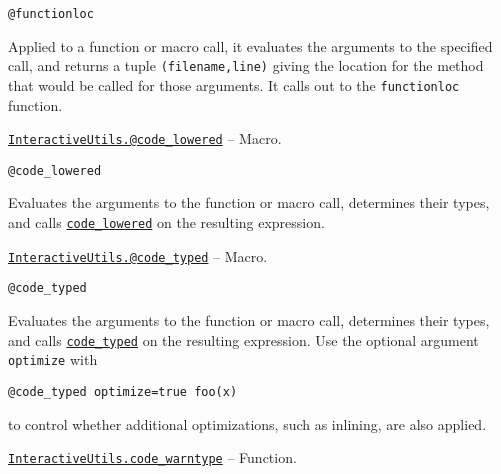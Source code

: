 \begin{adjustwidth}{2em}{0pt}


\begin{verbatim}
@functionloc
\end{verbatim}

Applied to a function or macro call, it evaluates the arguments to the specified call, and returns a tuple \texttt{(filename,line)} giving the location for the method that would be called for those arguments. It calls out to the \texttt{functionloc} function.



\end{adjustwidth}
\hypertarget{1376948972689074219}{} 
\hyperlink{1376948972689074219}{\texttt{InteractiveUtils.@code\_lowered}}  -- {Macro.}

\begin{adjustwidth}{2em}{0pt}


\begin{verbatim}
@code_lowered
\end{verbatim}

Evaluates the arguments to the function or macro call, determines their types, and calls \hyperlink{18235967286596219009}{\texttt{code\_lowered}} on the resulting expression.



\end{adjustwidth}
\hypertarget{6823997547688846780}{} 
\hyperlink{6823997547688846780}{\texttt{InteractiveUtils.@code\_typed}}  -- {Macro.}

\begin{adjustwidth}{2em}{0pt}


\begin{verbatim}
@code_typed
\end{verbatim}

Evaluates the arguments to the function or macro call, determines their types, and calls \hyperlink{14801595959157535515}{\texttt{code\_typed}} on the resulting expression. Use the optional argument \texttt{optimize} with


\begin{lstlisting}
@code_typed optimize=true foo(x)
\end{lstlisting}

to control whether additional optimizations, such as inlining, are also applied.



\end{adjustwidth}
\hypertarget{5565852192659724503}{} 
\hyperlink{5565852192659724503}{\texttt{InteractiveUtils.code\_warntype}}  -- {Function.}


